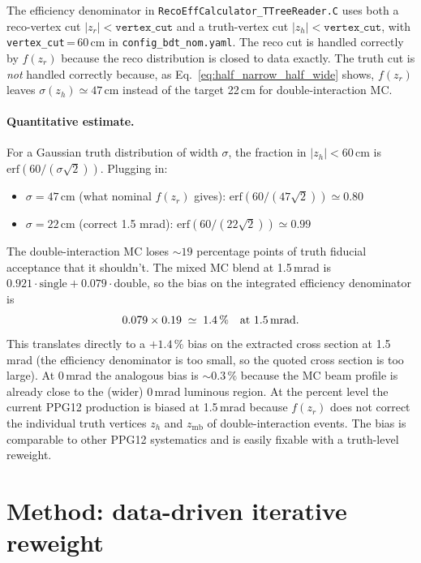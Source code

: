 \documentclass[11pt,a4paper]{article}
\begin{document}
The efficiency denominator in
\texttt{RecoEffCalculator\_TTreeReader.C} uses both a reco-vertex cut
$|z_r|<\mathtt{vertex\_cut}$ and a truth-vertex cut
$|z_h|<\mathtt{vertex\_cut}$, with
\texttt{vertex\_cut}\,=\,60\,cm in \texttt{config\_bdt\_nom.yaml}. The
reco cut is handled correctly by $f(z_r)$ because the reco distribution
is closed to data exactly. The truth cut is \emph{not} handled correctly
because, as Eq.~\eqref{eq:half_narrow_half_wide} shows, $f(z_r)$ leaves
$\sigma(z_h) \simeq 47$\,cm instead of the target 22\,cm for
double-interaction MC.

\paragraph{Quantitative estimate.} For a Gaussian truth distribution of
width $\sigma$, the fraction in $|z_h|<60$\,cm is
$\mathrm{erf}(60/(\sigma\sqrt{2}))$. Plugging in:
\begin{itemize}\setlength\itemsep{1pt}
\item $\sigma\!=\!47$\,cm (what nominal $f(z_r)$ gives):
      $\mathrm{erf}(60/(47\sqrt 2)) \simeq 0.80$
\item $\sigma\!=\!22$\,cm (correct 1.5 mrad):
      $\mathrm{erf}(60/(22\sqrt 2)) \simeq 0.99$
\end{itemize}
The double-interaction MC loses $\sim\!19$ percentage points of truth
fiducial acceptance that it shouldn't. The mixed MC blend at 1.5\,mrad
is $0.921\!\cdot\!\mathrm{single} + 0.079\!\cdot\!\mathrm{double}$, so
the bias on the integrated efficiency denominator is
\[
0.079 \times 0.19 \;\simeq\; 1.4\,\% \quad \text{at 1.5\,mrad.}
\]
This translates directly to a $+1.4\,\%$ bias on the extracted cross
section at 1.5\,mrad (the efficiency denominator is too small, so the
quoted cross section is too large). At 0\,mrad the analogous bias is
$\sim\!0.3\,\%$ because the MC beam profile is already close to the
(wider) 0\,mrad luminous region. At the percent level the current PPG12
production is biased at 1.5\,mrad because $f(z_r)$ does not correct the
individual truth vertices $z_h$ and $z_\mathrm{mb}$ of double-interaction
events. The bias is comparable to other PPG12 systematics and is easily
fixable with a truth-level reweight.

\section{Method: data-driven iterative reweight}
\label{sec:method}
\end{document}
